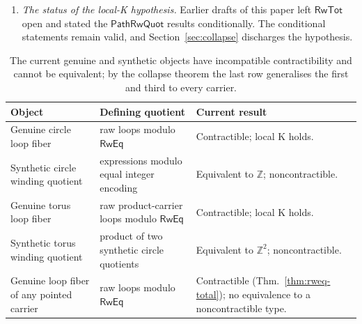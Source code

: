 \documentclass[10pt,reqno]{amsart}
\newcommand{\RwTot}{\mathsf{RwTot}}
\newcommand{\PRW}{\mathsf{PathRwQuot}}
\begin{document}
\begin{enumerate}[label=(C\arabic*),leftmargin=3.1em]
  documentation described the implemented normalization function as
  characterizing rewrite equivalence.  That function returns
  \(\mathsf{stepChain}(\pi_{=}p)\) and therefore depends only on the ambient
  equality; it is a sound invariant, and equality of normal forms is not by
  itself a rewrite certificate.  Derivations in this paper accordingly exhibit
  named primitive rules.  (Theorem~\ref{thm:rweq-total} shows that this
  particular invariant happens to be complete as well, but for a reason that has
  nothing to do with normalization: both sides of the equivalence are
  trivial.)
\item \emph{The status of the local-K hypothesis.}  Earlier drafts of this paper
  left \(\RwTot\) open and stated the \(\PRW\) results conditionally.  The
  conditional statements remain valid, and Section~\ref{sec:collapse} discharges
  the hypothesis.
\end{enumerate}

\begin{table}[t]
\centering
\small
\renewcommand{\arraystretch}{1.18}
\begin{tabular}{>{\raggedright\arraybackslash}p{}
                >{\raggedright\arraybackslash}p{}
                >{\raggedright\arraybackslash}p{}}
\toprule
Object & Defining quotient & Current result\\
\midrule
Genuine circle loop fiber
 & raw loops modulo \(\mathsf{RwEq}\)
 & Contractible; local K holds.\\
Synthetic circle winding quotient
 & expressions modulo equal integer encoding
 & Equivalent to \(\mathbb Z\); noncontractible.\\
Genuine torus loop fiber
 & raw product-carrier loops modulo \(\mathsf{RwEq}\)
 & Contractible; local K holds.\\
Synthetic torus winding quotient
 & product of two synthetic circle quotients
 & Equivalent to \(\mathbb Z^2\); noncontractible.\\
Genuine loop fiber of any pointed carrier
 & raw loops modulo \(\mathsf{RwEq}\)
 & Contractible (Thm.~\ref{thm:rweq-total}); no equivalence to a
   noncontractible type.\\
\bottomrule
\end{tabular}
\caption{The current genuine and synthetic objects have incompatible
contractibility and cannot be equivalent; by the collapse theorem the last row
generalises the first and third to every carrier.}
\label{tab:genuine-synthetic}
\end{table}
\end{document}
